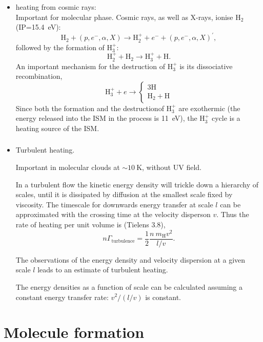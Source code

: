 \begin{frame}
\begin{itemize}
\item heating from cosmic rays:\\
Important for molecular phase. Cosmic rays, as well as X-rays, ionise H$_2$ (IP=15.4~eV):
\[ \mathrm{H}_2 + (p,e^-,\alpha,X) \rightarrow \mathrm{H}_2^+ + e^- +  (p,e^-,\alpha,X)^\prime,
\]
followed by the formation of $\mathrm{H}_3^+$:
\[ \mathrm{H}_2^+ +   \mathrm{H}_2 \rightarrow \mathrm{H}_3^+ + \mathrm{H}. \]
An important mechanism for the destruction of H$_3^+$ is its
dissociative recombination,
\[ \mathrm{H}_3^+ + e \rightarrow \left\{ \begin{array}{c} 3\mathrm{H} \\
  \mathrm{H}_2 + \mathrm{H} \end{array} \right. \] Since both the
  formation and the destructionof H$_3^+$ are exothermic (the energy
  released into the ISM in the process is 11~eV), the 
  H$_3^+$ cycle is a heating source of the ISM.
\end{itemize}

\end{frame} \begin{frame}\frametitle{}


\begin{itemize}
\item Turbulent heating.

Important in molecular clouds at $\sim 10~$K, without UV field. 


In a turbulent flow the kinetic energy density will trickle down a
hierarchy of scales, until it is dissipated by diffusion at the
smallest scale fixed by viscosity. The timescale for downwards energy
transfer at scale $l$ can be approximated with the crossing time at
the velocity disperson $v$. Thus the rate of heating per unit volume
is (Tielens 3.8),
\[ n \Gamma_\mathrm{turbulence} = \frac{1}{2} \frac{n ~ m_\mathrm{H}
v^2}{l/v} . \]

The observations of the energy density and velocity dispersion at a
given scale $l$ leads to an estimate of turbulent heating. 

The energy densities as a function of scale can be calculated assuming
a constant energy transfer rate: $ v^2 / (l/v)$ is constant. 

\end{itemize}



\end{frame}

\section{Molecule formation}

